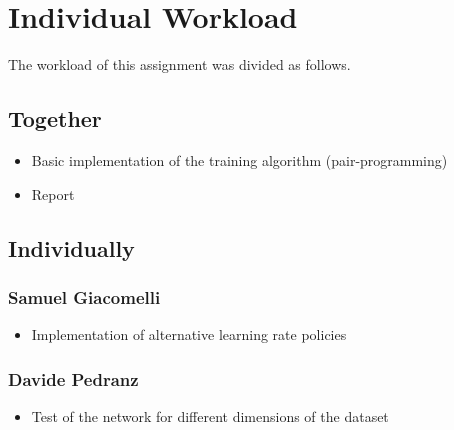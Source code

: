 \section{Individual Workload}
The workload of this assignment was divided as follows.

\subsection{Together}
\begin{itemize}
    \item Basic implementation of the training algorithm (pair-programming)
    \item Report
\end{itemize}

\subsection{Individually}
\subsubsection{Samuel Giacomelli}
\begin{itemize}
    \item Implementation of alternative learning rate policies
\end{itemize}
\subsubsection{Davide Pedranz}
\begin{itemize}
    \item Test of the network for different dimensions of the dataset
\end{itemize}
